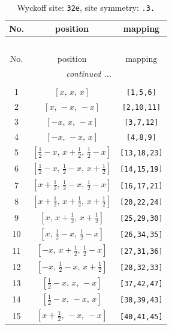 \documentclass[fleqn,8pt]{jsarticle}
\begin{document}
\begin{longtable}{ccc}
\caption{Wyckoff site: {\tt 32e}, site symmetry: {\tt .3.}}
 \\
 \hline \hline
No. & position & mapping \\ \hline \endfirsthead

\multicolumn{2}{l}{\tablename\ \thetable{}} \\
 \hline \hline
No. & position & mapping \\ \hline \endhead

 \hline \hline
\multicolumn{2}{r}{\footnotesize\it continued ...} \\ \endfoot

 \hline \hline
\multicolumn{2}{r}{} \\ \endlastfoot

1 & $\left[ x,\, x,\, x \right]$ & {\tt [1,5,6]} \\ \hline
2 & $\left[ x,\, - x,\, - x \right]$ & {\tt [2,10,11]} \\ \hline
3 & $\left[ - x,\, x,\, - x \right]$ & {\tt [3,7,12]} \\ \hline
4 & $\left[ - x,\, - x,\, x \right]$ & {\tt [4,8,9]} \\ \hline
5 & $\left[ \frac{1}{2} - x,\, x + \frac{1}{2},\, \frac{1}{2} - x \right]$ & {\tt [13,18,23]} \\ \hline
6 & $\left[ \frac{1}{2} - x,\, \frac{1}{2} - x,\, x + \frac{1}{2} \right]$ & {\tt [14,15,19]} \\ \hline
7 & $\left[ x + \frac{1}{2},\, \frac{1}{2} - x,\, \frac{1}{2} - x \right]$ & {\tt [16,17,21]} \\ \hline
8 & $\left[ x + \frac{1}{2},\, x + \frac{1}{2},\, x + \frac{1}{2} \right]$ & {\tt [20,22,24]} \\ \hline
9 & $\left[ x,\, x + \frac{1}{2},\, x + \frac{1}{2} \right]$ & {\tt [25,29,30]} \\ \hline
10 & $\left[ x,\, \frac{1}{2} - x,\, \frac{1}{2} - x \right]$ & {\tt [26,34,35]} \\ \hline
11 & $\left[ - x,\, x + \frac{1}{2},\, \frac{1}{2} - x \right]$ & {\tt [27,31,36]} \\ \hline
12 & $\left[ - x,\, \frac{1}{2} - x,\, x + \frac{1}{2} \right]$ & {\tt [28,32,33]} \\ \hline
13 & $\left[ \frac{1}{2} - x,\, x,\, - x \right]$ & {\tt [37,42,47]} \\ \hline
14 & $\left[ \frac{1}{2} - x,\, - x,\, x \right]$ & {\tt [38,39,43]} \\ \hline
15 & $\left[ x + \frac{1}{2},\, - x,\, - x \right]$ & {\tt [40,41,45]} \\ \hline

\end{longtable}
\end{document}
